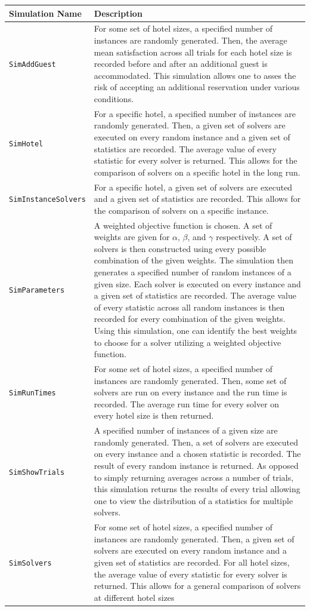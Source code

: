 \documentclass[11 pt]{article}
\begin{document}
\begin{center}
\begin{tabular}{|l|p{12cm}|}
\hline
\textbf{Simulation Name} & \textbf{Description} \\
\hline
\texttt{SimAddGuest} & For some set of hotel sizes, a specified number of instances are randomly generated. Then, the average mean satisfaction across all trials for each hotel size is recorded before and after an additional guest is accommodated. This simulation allows one to asses the risk of accepting an additional reservation under various conditions. \\
\hline
\texttt{SimHotel} & For a specific hotel, a specified number of instances are randomly generated. Then, a given set of solvers are executed on every random instance and a given set of statistics are recorded. The average value of every statistic for every solver is returned. This allows for the comparison of solvers on a specific hotel in the long run.  \\
\hline
\texttt{SimInstanceSolvers} & For a specific hotel, a given set of solvers are executed and a given set of statistics are recorded. This allows for the comparison of solvers on a specific instance.  \\
\hline
\texttt{SimParameters} & A weighted objective function is chosen. A set of weights are given for $\alpha$, $\beta$, and $\gamma$ respectively. A set of solvers is then constructed using every possible combination of the given weights. The simulation then generates a specified number of random instances of a given size. Each solver is executed on every instance and a given set of statistics are recorded. The average value of every statistic across all random instances is then recorded for every combination of the given weights. Using this simulation, one can identify the best weights to choose for a solver utilizing a weighted objective function.    \\
\hline
\texttt{SimRunTimes} &  For some set of hotel sizes, a specified number of instances are randomly generated. Then, some set of solvers are run on every instance and the run time is recorded. The average run time for every solver on every hotel size is then returned. \\ 
\hline
\texttt{SimShowTrials} & A specified number of instances of a given size are randomly generated. Then, a set of solvers are executed on every instance and a chosen statistic is recorded. The result of every random instance is returned. As opposed to simply returning averages across a number of trials, this simulation returns the results of every trial allowing one to view the distribution of a statistics for multiple solvers.   \\
\hline
\texttt{SimSolvers} & For some set of hotel sizes, a specified number of instances are randomly generated. Then, a given set of solvers are executed on every random instance and a given set of statistics are recorded. For all hotel sizes, the average value of every statistic for every solver is returned. This allows for a general comparison of solvers at different hotel sizes \\
\hline
\end{tabular}
\end{center}
\end{document}

